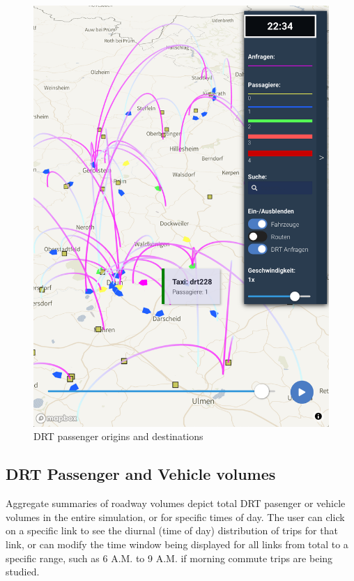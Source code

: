 \begin{figure}[ht]
\begin{minipage}[c]{0.45\textwidth}
   \includegraphics[width=\linewidth]{chapters/22-avov/images/fig-drt-flyovers.png}
   \caption{DRT passenger origins and destinations}
   \label{fig:avov-drt-od}
\end{minipage}
\end{figure}

\subsection{DRT Passenger and Vehicle volumes}
\label{avov-volumes}

Aggregate summaries of roadway volumes depict total DRT pasenger or vehicle volumes in the entire simulation, or for specific times of day. The user can click on a specific link to see the diurnal (time of day) distribution of trips for that link, or can modify the time window being displayed for all links from total to a specific range, such as 6 A.M. to 9 A.M. if morning commute trips are being studied.

